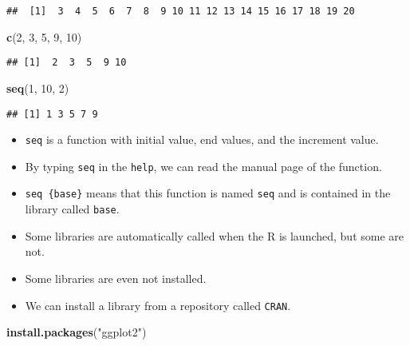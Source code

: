 \documentclass[
]{book}
\newenvironment{Shaded}{\begin{snugshade}}{\end{snugshade}}
\newcommand{\DecValTok}[1]{\textcolor[rgb]{0.00,0.00,0.81}{#1}}
\newcommand{\KeywordTok}[1]{\textcolor[rgb]{0.13,0.29,0.53}{\textbf{#1}}}
\newcommand{\NormalTok}[1]{#1}
\newcommand{\StringTok}[1]{\textcolor[rgb]{0.31,0.60,0.02}{#1}}
\providecommand{\tightlist}{%
  \setlength{\itemsep}{0pt}\setlength{\parskip}{0pt}}
\begin{document}
\begin{verbatim}
##  [1]  3  4  5  6  7  8  9 10 11 12 13 14 15 16 17 18 19 20
\end{verbatim}

\begin{Shaded}
\begin{Highlighting}[]
\KeywordTok{c}\NormalTok{(}\DecValTok{2}\NormalTok{, }\DecValTok{3}\NormalTok{, }\DecValTok{5}\NormalTok{, }\DecValTok{9}\NormalTok{, }\DecValTok{10}\NormalTok{)}
\end{Highlighting}
\end{Shaded}

\begin{verbatim}
## [1]  2  3  5  9 10
\end{verbatim}

\begin{Shaded}
\begin{Highlighting}[]
\KeywordTok{seq}\NormalTok{(}\DecValTok{1}\NormalTok{, }\DecValTok{10}\NormalTok{, }\DecValTok{2}\NormalTok{)}
\end{Highlighting}
\end{Shaded}

\begin{verbatim}
## [1] 1 3 5 7 9
\end{verbatim}

\begin{itemize}
\tightlist
\item
  \texttt{seq} is a function with initial value, end values, and the increment value.
\item
  By typing \texttt{seq} in the \texttt{help}, we can read the manual page of the function.
\item
  \texttt{seq\ \{base\}} means that this function is named \texttt{seq} and is contained in the library called \texttt{base}.
\item
  Some libraries are automatically called when the R is launched, but some are not.
\item
  Some libraries are even not installed.
\item
  We can install a library from a repository called \texttt{CRAN}.
\end{itemize}

\begin{Shaded}
\begin{Highlighting}[]
\KeywordTok{install.packages}\NormalTok{(}\StringTok{"ggplot2"}\NormalTok{)}
\end{Highlighting}
\end{Shaded}
\end{document}
